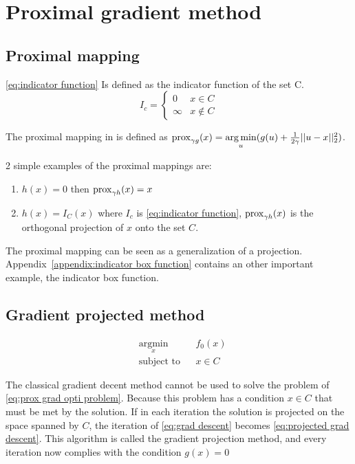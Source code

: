 \chapter{Proximal gradient method}
	\section{Proximal mapping}		
		\eqref{eq:indicator function} Is defined as the indicator function of the set C.
		\begin{equation}
		I_c = 
		\begin{cases}
		0 & x \in C  \\
		\infty & x \notin C
		\end{cases}
		\label{eq:indicator function}
		\end{equation}
		
		The proximal mapping in \cite{NealParikh} is defined as $\operatorname{prox}_{\gamma g}(x)= \underset{u}{\operatorname*{arg\,min}}(g(u) + \frac{1}{2 \gamma}||u-x||^2_2)$. 
		
		2 simple examples of the proximal mappings are:
		\begin{enumerate}
			\item $h(x)=0$ then $\operatorname{prox}_{\gamma h}(x)=x$ 
			\item $h(x)=I_C(x)$ where $I_c$ is \eqref{eq:indicator function}, $\operatorname{prox}_{\gamma h}(x)$ is the orthogonal projection of $x$ onto the set $C$.
		\end{enumerate}

		The proximal mapping can be seen as a generalization of a projection. Appendix~\ref{appendix:indicator box function} contains an other important example, the indicator box function.
	
	\section{Gradient projected method}
		
		\begin{equation}
			\begin{aligned}
			& \underset{x}{\text{argmin}}
			& & f_0(x) \\
			& \text{subject to}
			& & x \in C
			\end{aligned}
			\label{eq:prox grad opti problem}
		\end{equation}
		
		The classical gradient decent method cannot be used to solve the problem of \eqref{eq:prox grad opti problem}. Because this problem has a condition $x \in C$ that must be met by the solution. If in each iteration the solution is projected on the space spanned by $C$, the iteration of \eqref{eq:grad descent} becomes \eqref{eq:projected grad descent}. This algorithm is called the gradient projection method, and every iteration now complies with the condition $g(x)=0$
		
